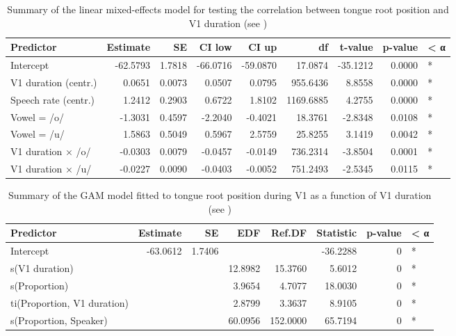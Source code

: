 \documentclass[preprint]{JASAnew}
\begin{document}
\begin{table}

\caption{\label{tab:tra-lm-2-table}Summary of the linear mixed-effects model for testing the correlation between tongue root position and V1 duration  (see )}
\centering
\fontsize{10}{12}\selectfont
\begin{tabular}[t]{lrrrrrrrl}
\toprule
Predictor & Estimate & SE & CI low & CI up & df & t-value & p-value & < α\\
\midrule
Intercept & -62.5793 & 1.7818 & -66.0716 & -59.0870 & 17.0874 & -35.1212 & 0.0000 & *\\
V1 duration (centr.) & 0.0651 & 0.0073 & 0.0507 & 0.0795 & 955.6436 & 8.8558 & 0.0000 & *\\
Speech rate (centr.) & 1.2412 & 0.2903 & 0.6722 & 1.8102 & 1169.6885 & 4.2755 & 0.0000 & *\\
Vowel = /o/ & -1.3031 & 0.4597 & -2.2040 & -0.4021 & 18.3761 & -2.8348 & 0.0108 & *\\
Vowel = /u/ & 1.5863 & 0.5049 & 0.5967 & 2.5759 & 25.8255 & 3.1419 & 0.0042 & *\\
V1 duration × /o/ & -0.0303 & 0.0079 & -0.0457 & -0.0149 & 736.2314 & -3.8504 & 0.0001 & *\\
V1 duration × /u/ & -0.0227 & 0.0090 & -0.0403 & -0.0052 & 751.2493 & -2.5345 & 0.0115 & *\\
\bottomrule
\end{tabular}
\end{table}

\begin{table}

\caption{\label{tab:tra-gam-ar-2-table}Summary of the GAM model fitted to tongue root position during V1 as a function of V1 duration (see )}
\centering
\fontsize{10}{12}\selectfont
\begin{tabular}[t]{lrrrrrrl}
\toprule
Predictor & Estimate & SE & EDF & Ref.DF & Statistic & p-value & < α\\
\midrule
Intercept & -63.0612 & 1.7406 &  &  & -36.2288 & 0 & *\\
s(V1 duration) &  &  & 12.8982 & 15.3760 & 5.6012 & 0 & *\\
s(Proportion) &  &  & 3.9654 & 4.7077 & 18.0030 & 0 & *\\
ti(Proportion, V1 duration) &  &  & 2.8799 & 3.3637 & 8.9105 & 0 & *\\
s(Proportion, Speaker) &  &  & 60.0956 & 152.0000 & 65.7194 & 0 & *\\
\bottomrule
\end{tabular}
\end{table}
\end{document}
